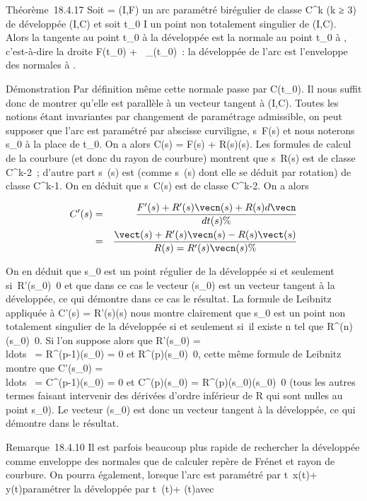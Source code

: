 \documentclass[]{article}
\begin{document}
Théorème~18.4.17 Soit \Gamma = (I,F) un arc paramétré birégulier de classe
C^k (k ≥ 3) de développée (I,C) et soit t\_0 \in I un
point non totalement singulier de (I,C). Alors la tangente au point
t\_0 à la développée est la normale au point t\_0 à \Gamma,
c'est-à-dire la droite F(t\_0) +
~\vecn\_\Gamma(t\_0)~: la développée de
l'arc \Gamma est l'enveloppe des normales à \Gamma.

Démonstration Par définition même cette normale passe par
C(t\_0). Il nous suffit donc de montrer qu'elle est parallèle à
un vecteur tangent à (I,C). Toutes les notions étant invariantes par
changement de paramétrage admissible, on peut supposer que l'arc est
paramétré par abscisse curviligne, s\mapsto~F(s) et
nous noterons s\_0 à la place de t\_0. On a alors C(s) =
F(s) + R(s)\vecn(s). Les formules de calcul de la
courbure (et donc du rayon de courbure) montrent que
s\mapsto~R(s) est de classe C^k-2~;
d'autre part s\mapsto~\vecn(s)
est (comme s\mapsto~\vect(s) dont
elle se déduit par rotation) de classe C^k-1. On en déduit
que s\mapsto~C(s) est de classe C^k-2. On
a alors

\begin{align*} C'(s)& =& F'(s) +
R'(s)\vecn(s) + R(s) d\vecn
\over dt (s) \%& \\ &
=& \vect(s) + R'(s)\vecn(s) -
R(s) \vect(s) \over R(s) =
R'(s)\vecn(s)\%& \\
\end{align*}

On en déduit que s\_0 est un point régulier de la développée si
et seulement si~R'(s\_0)\neq~0 et que
dans ce cas le vecteur \vecn(s\_0) est un
vecteur tangent à la développée, ce qui démontre dans ce cas le
résultat. La formule de Leibnitz appliquée à C'(s) =
R'(s)\vecn(s) nous montre clairement que s\_0
est un point non totalement singulier de la développée si et seulement
si~il existe n tel que
R^(n)(s\_0)\neq~0. Si l'on
suppose alors que R'(s\_0) =
\\ldots~ =
R^(p-1)(s\_0) = 0 et
R^(p)(s\_0)\neq~0, cette même
formule de Leibnitz montre que C'(s\_0) =
\\ldots~ =
C^(p-1)(s\_0) = 0 et C^(p)(s\_0) =
R^(p)(s\_0)\vecn(s\_0)\neq~0
(tous les autres termes faisant intervenir des dérivées d'ordre
inférieur de R qui sont nulles au point s\_0). Le vecteur
\vecn(s\_0) est donc un vecteur tangent à la
développée, ce qui démontre dans le résultat.

Remarque~18.4.10 Il est parfois beaucoup plus rapide de rechercher la
développée comme enveloppe des normales que de calculer repère de Frénet
et rayon de courbure. On pourra également, lorsque l'arc est paramétré
par t\mapsto~x(t)\vec\imath +
y(t) paramétrer la développée par
t\mapsto~\xi(t)\vec\imath +
\eta(t) avec
\end{document}
